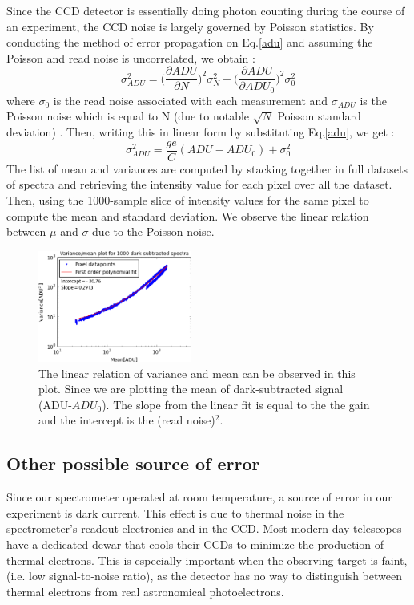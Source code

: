 \documentclass[authoryear, 12pt,5p, times]{elsarticle}
\begin{document}
 
Since the CCD detector is essentially doing photon counting during the course of an experiment, the CCD noise is largely governed by Poisson statistics. By conducting the method of error propagation on Eq.\ref{adu} and assuming the Poisson and read noise is uncorrelated, we obtain :
\begin{equation}
\sigma^2_{ADU} = \Bigg(\frac{\partial ADU}{\partial N}\Bigg)^2 \sigma_N^2 +\Bigg(\frac{\partial ADU}{\partial ADU_0}\Bigg)^2\sigma_0^2
\label{error}
\end{equation}
where $\sigma_0$ is the read noise associated with each measurement and $\sigma_{ADU}$ is the   Poisson noise which is equal to N (due to notable  $\sqrt{N}$ Poisson standard deviation) . Then,  writing this in linear form by substituting Eq.\ref{adu}, we get :
\begin{equation}
\sigma^2_{ADU}=\frac{ge}{C}(ADU- ADU_0)+\sigma_0^2
\label{linear_error_relation}
\end{equation}
The list of mean and variances are computed by stacking together in full datasets  of spectra and retrieving the intensity value for each pixel over all the dataset. Then, using the 1000-sample slice of intensity values for the same pixel to compute the mean and standard deviation. We observe the linear relation between $\mu$ and $\sigma$ due to the Poisson noise. 
 \begin{figure}[h!]\includegraphics[width=0.45\textwidth]{figures/varmeanplot}
\caption{The linear relation of variance and mean can be observed in this plot. Since we are plotting the mean of dark-subtracted signal (ADU-$ADU_0$). The slope from the linear fit is equal to the the gain and the intercept is the (read noise)$^2$.} \label{varmean}
\end{figure}
\subsection{Other possible source of error}
Since our spectrometer operated at room temperature, a source of error in our experiment is dark current. This effect is due to thermal noise in the spectrometer's readout electronics and in the CCD. Most modern day telescopes have a dedicated dewar that cools their CCDs to minimize the production of thermal electrons. This is especially important when the observing target is faint, (i.e. low signal-to-noise ratio), as the detector has no way to distinguish between thermal electrons from real astronomical photoelectrons.
\end{document}
